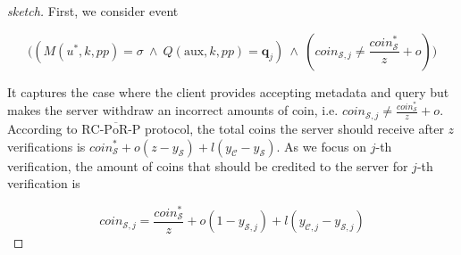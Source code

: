 \begin{proof}[sketch]
  First, we consider event 
  
   $$\Big((M(u^{\scriptscriptstyle *},k,{pp})= \sigma \  \wedge \ Q(\text{aux},k, {pp})= \bm{q}_{\scriptscriptstyle j})\ \wedge \
(coin_{\scriptscriptstyle\mathcal{S},j}\neq  \frac{coin_{\scriptscriptstyle\mathcal S}^{\scriptscriptstyle*}}{z}+o)\Big)$$
  
  
  It captures the case where the client provides  accepting metadata and query  but makes the server withdraw an incorrect amounts of coin, i.e. $coin_{\scriptscriptstyle\mathcal{S},j}\neq  \frac{coin_{\scriptscriptstyle\mathcal S}^{\scriptscriptstyle*}}{z}+o$. According to  ${\text{RC-}\overline{\text{PoR}}\text{-P}}$ protocol, the total coins the server should receive after $z$ verifications is $coin^{\scriptscriptstyle *}_{\scriptscriptstyle\mathcal S}+o(z-y_{\scriptscriptstyle\mathcal S})+l(y_{\scriptscriptstyle\mathcal C}-y_{\scriptscriptstyle\mathcal S})$. As we focus on  $j$-th verification, the amount of  coins that should be credited to the server for $j$-th verification is
  
  \begin{equation}\label{equ::what-server-recives-in-j-2}
   coin_{\scriptscriptstyle\mathcal{S},j}=\frac{coin^{\scriptscriptstyle *}_{\scriptscriptstyle\mathcal S}}{z}+o(1-y_{\scriptscriptstyle\mathcal {S},j})+l(y_{\scriptscriptstyle\mathcal {C},j}-y_{\scriptscriptstyle\mathcal {S},j})
     \end{equation}
  
  
  

\end{proof}
